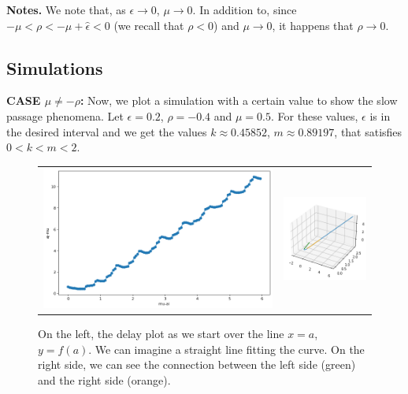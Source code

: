 \documentclass[a4paper,preprint,11pt]{article}
\begin{document}
\textbf{Notes.} We note that, as $\epsilon\to 0$, $\mu\to 0$. In addition to, since $-\mu<\rho<-\mu+\hat{\epsilon}<0$ (we recall that $\rho<0$) and $\mu\to 0$, it happens that $\rho\to 0$.

\subsection{Simulations}
\textbf{CASE \boldmath$\mu\neq-\rho$:} Now, we plot a simulation with a certain value to show the slow passage phenomena. Let $\epsilon = 0.2$, $\rho = -0.4$ and $\mu = 0.5$. For these values, $\epsilon$ is in the desired interval and we get the values $k\approx 0.45852$, $m\approx 0.89197$, that satisfies $0<k<m<2$.

\begin{figure}[h]
\begin{tabular}{cc}
\includegraphics[scale=0.34]{Slow_Passage/SP3Dline.png} &
\includegraphics[scale=0.6]{Slow_Passage/SP3Dcurve.png}
\end{tabular}
\caption{On the left, the delay plot as we start over the line $x=a$, $y=f(a)$. We can imagine a straight line fitting the curve. On the right side, we can see the connection between the left side (green) and the right side (orange).}
\label{fig:SP3D}
\end{figure}
\end{document}
